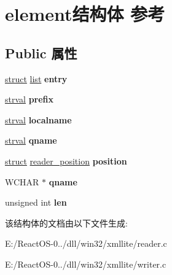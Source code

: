 \hypertarget{structelement}{}\section{element结构体 参考}
\label{structelement}
\subsection*{Public 属性}
\begin{DoxyCompactItemize}
\item 
\mbox{\label{structelement_ac35f7b30844bde5789240ba4c2919c65}} 
\hyperlink{interfacestruct}{struct} \hyperlink{classlist}{list} {\bfseries entry}
\item 
\mbox{\label{structelement_a65d3548d41488e7f75c24f59270207d3}} 
\hyperlink{structstrval}{strval} {\bfseries prefix}
\item 
\mbox{\label{structelement_a25f171633da2c8438fa950f5cd7a40d1}} 
\hyperlink{structstrval}{strval} {\bfseries localname}
\item 
\mbox{\label{structelement_a7f038e68b80b554293d47b23353ee584}} 
\hyperlink{structstrval}{strval} {\bfseries qname}
\item 
\mbox{\label{structelement_acef6e3f4e028e0482fc0bf124523b6cc}} 
\hyperlink{interfacestruct}{struct} \hyperlink{structreader__position}{reader\+\_\+position} {\bfseries position}
\item 
\mbox{\label{structelement_a7bcb736df7f80e7a5f0b2910131fedd4}} 
W\+C\+H\+AR $\ast$ {\bfseries qname}
\item 
\mbox{\label{structelement_a822ecb05ceb6627897ab10ecf9e24b9f}} 
unsigned int {\bfseries len}
\end{DoxyCompactItemize}


该结构体的文档由以下文件生成\+:\begin{DoxyCompactItemize}
\item 
E\+:/\+React\+O\+S-\/0../dll/win32/xmllite/reader.\+c\item 
E\+:/\+React\+O\+S-\/0../dll/win32/xmllite/writer.\+c\end{DoxyCompactItemize}
